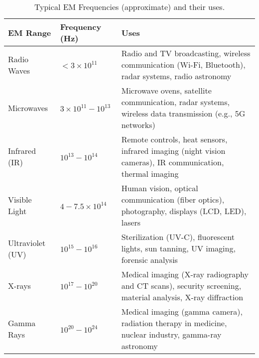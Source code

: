 \begin{table}[htbp]
	\centering
	\label{table:em-frequencies}
	\begin{tabularx}{\textwidth}{lXp{}}
		\toprule
		\textbf{EM Range} & \textbf{Frequency (Hz)} & \textbf{Uses} \\
		\midrule
		Radio Waves & $<3\times 10^{11}$ & Radio and TV broadcasting, wireless communication (Wi-Fi, Bluetooth), radar systems, radio astronomy \\
		Microwaves & $3\times 10^{11} - 10^{13}$ & Microwave ovens, satellite communication, radar systems, wireless data transmission (e.g., 5G networks) \\
		Infrared (IR) & $10^{13} - 10^{14}$ & Remote controls, heat sensors, infrared imaging (night vision cameras), IR communication, thermal imaging \\
		Visible Light & $4 - 7.5\times10^{14}$ & Human vision, optical communication (fiber optics), photography, displays (LCD, LED), lasers \\
		Ultraviolet (UV) & $10^{15} - 10^{16}$ & Sterilization (UV-C), fluorescent lights, sun tanning, UV imaging, forensic analysis \\
		X-rays & $10^{17} - 10^{20}$ & Medical imaging (X-ray radiography and CT scans), security screening, material analysis, X-ray diffraction \\
		Gamma Rays & $10^{20} - 10^{24}$ & Medical imaging (gamma camera), radiation therapy in medicine, nuclear industry, gamma-ray astronomy \\
		\bottomrule
	\end{tabularx}	
	\caption{Typical EM Frequencies (approximate) and their uses.}
\end{table}


































%
%














